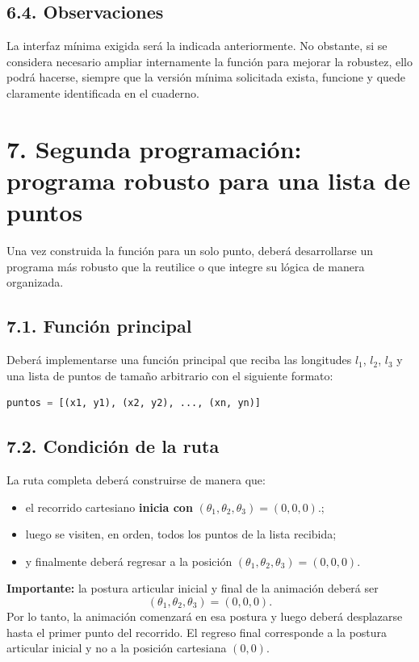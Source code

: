 \documentclass[12pt]{article}
\begin{document}
\subsection*{6.4. Observaciones}

La interfaz mínima exigida será la indicada anteriormente. No obstante, si se considera necesario ampliar internamente la función para mejorar la robustez, ello podrá hacerse, siempre que la versión mínima solicitada exista, funcione y quede claramente identificada en el cuaderno.

\section*{7. Segunda programación: programa robusto para una lista de puntos}

Una vez construida la función para un solo punto, deberá desarrollarse un programa más robusto que la reutilice o que integre su lógica de manera organizada.

\subsection*{7.1. Función principal}

Deberá implementarse una función principal que reciba las longitudes \(l_1\), \(l_2\), \(l_3\) y una lista de puntos de tamaño arbitrario con el siguiente formato:

\begin{lstlisting}[language=Python]
puntos = [(x1, y1), (x2, y2), ..., (xn, yn)]
\end{lstlisting}

\subsection*{7.2. Condición de la ruta}

La ruta completa deberá construirse de manera que:

\begin{itemize}
    \item el recorrido cartesiano \textbf{inicia con } $(\theta_1,\theta_2,\theta_3)=(0,0,0).$;
    \item luego se visiten, en orden, todos los puntos de la lista recibida;
    \item y finalmente deberá regresar a la posición $(\theta_1,\theta_2,\theta_3)=(0,0,0).$
\end{itemize}

\textbf{Importante:} la postura articular inicial y final de la animación deberá ser
\[
(\theta_1,\theta_2,\theta_3)=(0,0,0).
\]
Por lo tanto, la animación comenzará en esa postura y luego deberá desplazarse hasta el primer punto del recorrido. El regreso final corresponde a la postura articular inicial y no a la posición cartesiana \((0,0)\).
\end{document}
